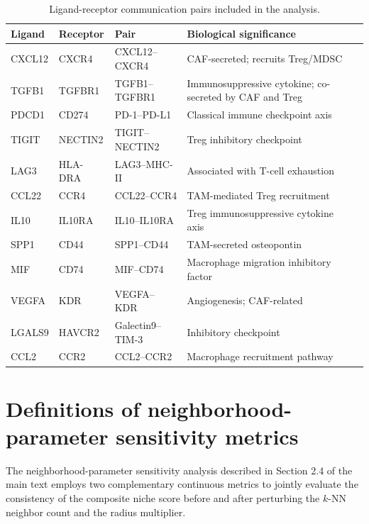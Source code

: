 \documentclass[12pt, a4paper]{article}
\begin{document}
\begin{table}[H]
\centering
\caption{Ligand-receptor communication pairs included in the analysis.}
\label{tab:lr_pairs}
\begin{tabularx}{\textwidth}{lllX}
\toprule
\textbf{Ligand} & \textbf{Receptor} & \textbf{Pair} & \textbf{Biological significance} \\
\midrule
CXCL12 & CXCR4   & CXCL12--CXCR4  & CAF-secreted; recruits Treg/MDSC~\citep{domanska2013targeting} \\
TGFB1  & TGFBR1  & TGFB1--TGFBR1  & Immunosuppressive cytokine; co-secreted by CAF and Treg~\citep{mariathasan2018tgfb} \\
PDCD1  & CD274   & PD-1--PD-L1    & Classical immune checkpoint axis~\citep{sharma2023immunosuppressive} \\
TIGIT  & NECTIN2 & TIGIT--NECTIN2 & Treg inhibitory checkpoint~\citep{sakaguchi2020regulatory} \\
LAG3   & HLA-DRA & LAG3--MHC-II   & Associated with T-cell exhaustion~\citep{sharma2023immunosuppressive} \\
CCL22  & CCR4    & CCL22--CCR4    & TAM-mediated Treg recruitment~\citep{curiel2004specific} \\
IL10   & IL10RA  & IL10--IL10RA   & Treg immunosuppressive cytokine axis~\citep{noy2014tumor} \\
SPP1   & CD44    & SPP1--CD44     & TAM-secreted osteopontin~\citep{biswas2010macrophage} \\
MIF    & CD74    & MIF--CD74      & Macrophage migration inhibitory factor~\citep{noy2014tumor} \\
VEGFA  & KDR     & VEGFA--KDR     & Angiogenesis; CAF-related~\citep{kalluri2016biology} \\
LGALS9 & HAVCR2  & Galectin9--TIM-3 & Inhibitory checkpoint~\citep{sharma2023immunosuppressive} \\
CCL2   & CCR2    & CCL2--CCR2     & Macrophage recruitment pathway~\citep{biswas2010macrophage} \\
\bottomrule
\end{tabularx}
\end{table}

\section{Definitions of neighborhood-parameter sensitivity metrics}
\label{app:sensitivity}

The neighborhood-parameter sensitivity analysis described in Section 2.4 of the main text employs two complementary continuous metrics to jointly evaluate the consistency of the composite niche score before and after perturbing the $k$-NN neighbor count and the radius multiplier.
\end{document}
